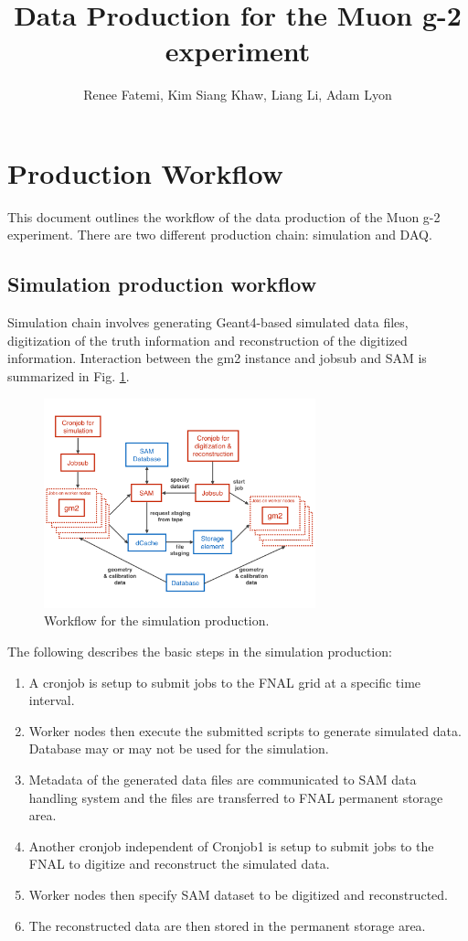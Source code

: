 \documentclass[12pt,letterpaper]{article}
\author{Renee Fatemi, Kim Siang Khaw, Liang Li, Adam Lyon}
\title{Data Production for the Muon g-2 experiment}
\begin{document}
\maketitle

\section{Production Workflow}
This document outlines the workflow of the data production of the Muon g-2 experiment. There are two different production chain: simulation and DAQ. 

\subsection{Simulation production workflow}
Simulation chain involves generating Geant4-based simulated data files, digitization of the truth information and reconstruction of the digitized information. Interaction between the gm2 instance and jobsub and SAM is summarized in Fig. \ref{fig:SimProd}.

\begin{figure}[htbp]
\centering
\includegraphics[width=0.7\textwidth]{pics/SimulationProductionWorkflow.pdf} 
\caption{Workflow for the simulation production.}\label{fig:SimProd}
\end{figure}

The following describes the basic steps in the simulation production:

\begin{enumerate}
\item A cronjob is setup to submit jobs to the FNAL grid at a specific time interval.
\item Worker nodes then execute the submitted scripts to generate simulated data. Database may or may not be used for the simulation.
\item Metadata of the generated data files are communicated to SAM data handling system and the files are transferred to FNAL permanent storage area.
\item Another cronjob independent of Cronjob1 is setup to submit jobs to the FNAL to digitize and reconstruct the simulated data.
\item Worker nodes then specify SAM dataset to be digitized and reconstructed.
\item The reconstructed data are then stored in the permanent storage area.
\end{enumerate}
\end{document}
